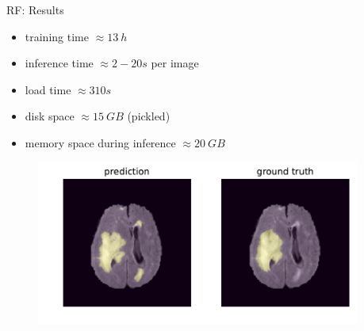 \documentclass[final]{beamer}
\newlength{\onecolwid}
\newlength{\twocolwid}
\begin{document}
\begin{frame}[t]
\begin{columns}[t]
\begin{column}{\twocolwid}
\begin{columns}[t,totalwidth=\twocolwid] %

\begin{column}{\onecolwid} %

\begin{block}{RF: Results}
\begin{itemize}[label={}]
\item training time $\approx \SI{13}{h}$
\item inference time $\approx \si{2-20}{s}$ per image
\item load time $\approx \si{310}{s}$
\item disk space $\approx \SI{15}{GB}$ (pickled)
\item memory space during inference $\approx \SI{20}{GB}$
\end{itemize}
\begin{figure}
\centering
\includegraphics[width=0.9\linewidth]{rf_prediction_84}
\end{figure}
\end{block}


\end{column} %

\begin{column}{\onecolwid} %



\end{column}
\end{columns}
\end{column}
\end{columns}
\end{frame}
\end{document}
